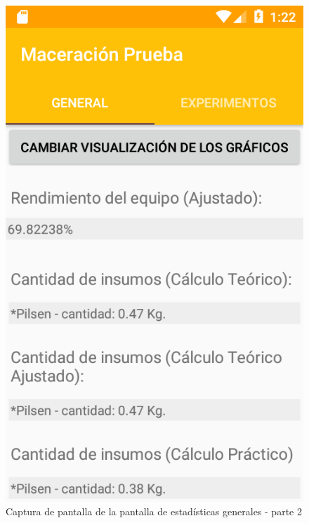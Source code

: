             \begin{figure}[h]
                \centering
                \includegraphics[scale=0.2]{software/ScreenCapture/GeneralStatistics-p2.jpg}
                \caption{Captura de pantalla de la pantalla de estadísticas generales - parte 2}
                \label{fig:CapturaGeneralFrag-P2}
            \end{figure}
            
